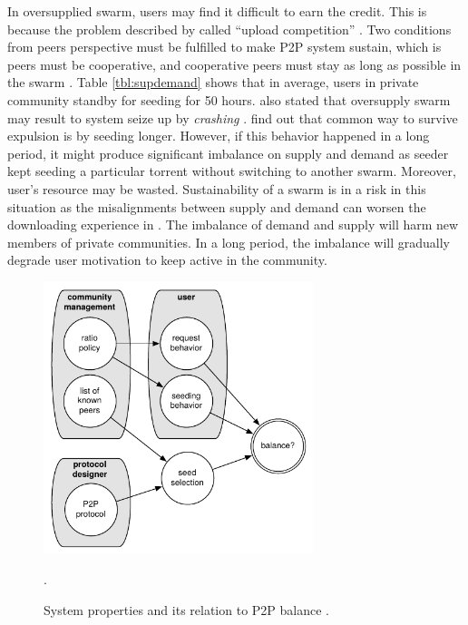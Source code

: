 In oversupplied swarm, users may find it difficult to earn the credit. This is because the problem described by \citeauthor{2011:managesupplydemand:meulpolder} called ``upload competition'' \cite{2011:managesupplydemand:meulpolder}. Two conditions from peers perspective must be fulfilled to make P2P system sustain, which is peers must be cooperative, and cooperative peers must stay as long as possible in the swarm \cite{2011:managesupplydemand:meulpolder}. Table \ref{tbl:supdemand} shows that in average, users in private community standby for seeding for 50 hours. \citeauthor{2010:crashsustain:rahman} also stated that oversupply swarm may result to system seize up by \textit{crashing}  \cite{2010:crashsustain:rahman}. \citeauthor{2013:survivepriv:jia} find out that common way to survive expulsion is by seeding longer. However, if this behavior happened in a long period, it might produce significant imbalance on supply and demand as seeder kept seeding a particular torrent without switching to another swarm. Moreover, user's resource may be wasted. Sustainability of a swarm is in a risk in this situation as the misalignments between supply and demand can worsen the downloading experience in \bt. The imbalance of demand and supply will harm new members of private communities. In a long period, the imbalance will gradually degrade user motivation to keep active in the community\cite{2014:sustainabilitytorrent:chen}.

\begin{figure}[h]
	\centering
	\includegraphics[width=0.7\textwidth]{pics/p2psys_balance.pdf}
	\caption{System properties and its relation to P2P balance \cite{2011:managesupplydemand:meulpolder}.}.
	\label{fig:sysbalance}
\end{figure}

